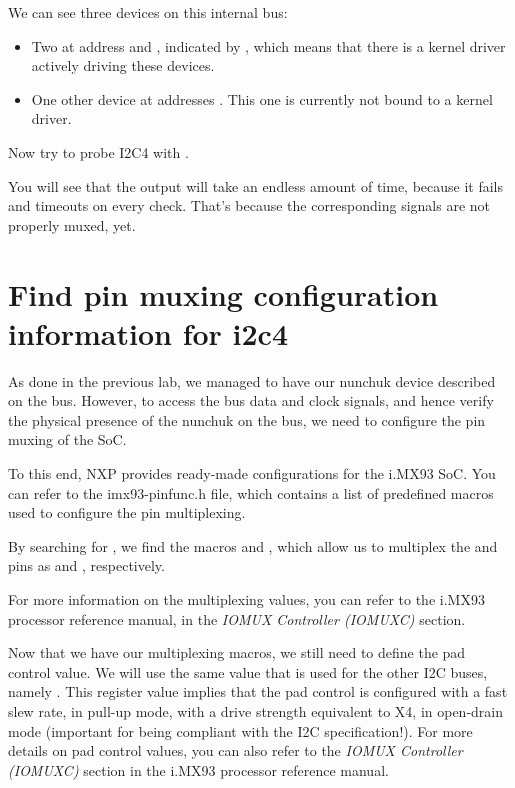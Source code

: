 We can see three devices on this internal bus:
\begin{itemize}
\item Two at address  and , indicated by ,
      which means that there is a kernel driver actively
      driving these devices.
\item One other device at addresses .
      This one is currently not bound to a kernel driver.
\end{itemize}

Now try to probe I2C4 with .

You will see that the output will take an endless amount of time, because it
fails and timeouts on every check. That's because the corresponding signals are
not properly muxed, yet.

\section{Find pin muxing configuration information for i2c4}

As done in the previous lab, we managed to have our nunchuk
device described on the  bus. However, to access the bus data and
clock signals, and hence verify the physical presence of the nunchuk on the bus,
we need to configure the pin muxing of the SoC.

To this end, NXP provides ready-made configurations for the i.MX93 SoC.  You can
refer to the imx93-pinfunc.h file, which contains a list of predefined macros
used to configure the pin multiplexing.

By searching for , we find the
macros 
and , which allow us to multiplex
the  and  pins as 
and , respectively.

For more information on the multiplexing values, you can refer to the i.MX93
processor reference manual, in the {\em IOMUX Controller (IOMUXC)} section.

Now that we have our multiplexing macros, we still need to define the pad
control value. We will use the same value that is used for the other I2C buses,
namely . This register value implies that the pad control is
configured with a fast slew rate, in pull-up mode, with a drive strength
equivalent to X4, in open-drain mode (important for being compliant with the I2C
specification!). For more details on pad control values, you can also refer to
the {\em IOMUX Controller (IOMUXC)} section in the i.MX93 processor reference
manual.

